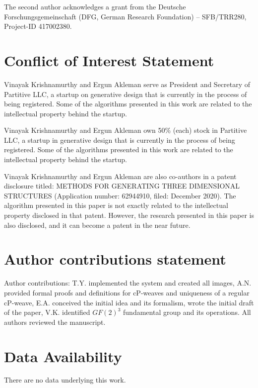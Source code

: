 \documentclass[unnumsec,webpdf,contemporary,large]{oup-authoring-template}%
\theoremstyle{thmstyleone}%
\theoremstyle{thmstyletwo}%
\theoremstyle{thmstylethree}%
\begin{document}
The second author acknowledges a grant from the  Deutsche Forschungsgemeinschaft (DFG, German Research Foundation) -- SFB/TRR280, Project-ID 417002380.

\section{Conflict of Interest Statement}

Vinayak Krishnamurthy and Ergun Akleman serve as President and Secretary of Partitive LLC, a startup on generative design that is currently in the process of being registered. Some of the algorithms presented in this work are related to the intellectual property behind the startup.

Vinayak Krishnamurthy and Ergun Akleman own 50\% (each) stock in Partitive LLC, a startup in generative design that is currently in the process of being registered. Some of the algorithms presented in this work are related to the intellectual property behind the startup.

Vinayak Krishnamurthy and Ergun Akleman are also co-authors in a patent disclosure titled: METHODS FOR GENERATING THREE DIMENSIONAL STRUCTURES (Application number: 62944910, filed: December 2020). The algorithm presented in this paper is not exactly related to the intellectual property disclosed in that patent. However, the research presented in this paper is also disclosed, and it can become a patent in the near future.

\section{Author contributions statement}

Author contributions: T.Y. implemented the system and created all images, A.N. provided formal proofs and definitions for cP-weaves and uniqueness of a regular cP-weave, E.A. conceived the initial idea and its formalism, wrote the initial draft of the paper, V.K. identified $GF(2)^3$ fundamental group and its operations. All authors reviewed the manuscript.


\section{Data Availability}

There are no data underlying this work.



\end{document}
